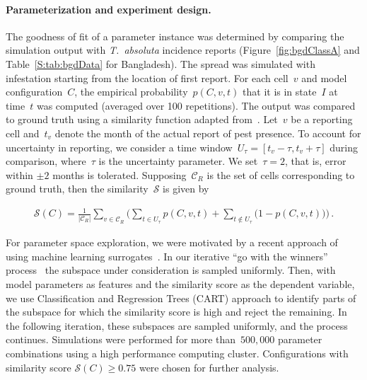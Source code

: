 \documentclass[11pt]{article}
\newcommand{\tuta}{\emph{T.~absoluta}}
\newcommand{\reportingCells}{\mathcal{C}_R}
\newcommand{\similarity}{\mathcal{S}}
\theoremstyle{definition}
\begin{document}
\paragraph{Parameterization and experiment design.}
The goodness of fit of a parameter instance was determined by comparing the
simulation output with \tuta{} incidence reports
(Figure~\ref{fig:bgdClassA} and Table~\ref{S:tab:bgdData} for Bangladesh).
The spread was simulated with infestation starting from the location of
first report. For each cell~$v$ and model configuration~$C$, the empirical
probability~$p(C,v,t)$ that it is in state~$I$ at time~$t$ was computed
(averaged over 100 repetitions). The output was compared to ground truth
using a similarity
function adapted from~\cite{carrasco2010unveiling}.  Let~$v$ be a reporting
cell and~$t_v$ denote the month of the actual report of pest presence.  To
account for uncertainty in reporting, we consider a time
window~$U_\tau=[t_v-\tau,t_v+\tau]$ during comparison, where~$\tau$ is the
uncertainty parameter. We set~$\tau=2$, that is, error within $\pm2$ months is
tolerated.  Supposing~$\reportingCells$ is the set of cells corresponding
to ground truth, then the
similarity~$\similarity$ is given by
\begin{linenomath}
\begin{align}\label{eqn:similarity}
    \similarity(C)=\frac{1}{|\reportingCells|}\sum_{v\in\reportingCells} \Big(\sum_{t\in U_\tau}p(C,v,t)
    + \sum_{t\notin U_\tau}\big(1-p(C,v,t)\big) \Big)\,.
\end{align}
\end{linenomath}
For parameter space exploration, we were motivated by a recent approach of
using machine learning surrogates~\cite{lamperti2018agent}. In our
iterative ``go with the winners'' process~\cite{aldous1994go} the subspace
under consideration is sampled uniformly. Then, with model parameters as
features and the similarity score as the dependent variable, we use
Classification and Regression Trees (CART) approach to identify parts of
the subspace for which the similarity score is high and reject the
remaining. In the following iteration, these subspaces are sampled
uniformly, and the process continues. Simulations were performed for more
than~$500,000$ parameter combinations using a high performance computing
cluster. Configurations with similarity score $\similarity(C)\ge0.75$ were
chosen for further analysis.
\end{document}
